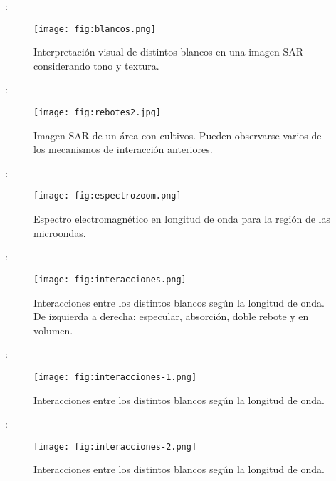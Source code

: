 \begin{frame}{\secname : \subsecname}
    \begin{figure}
      \centering
      \texttt{[image: fig:blancos.png]}
      \caption{Interpretación visual de distintos blancos en una imagen SAR considerando tono y textura.}
      \label{}
    \end{figure}
\end{frame}

\begin{frame}{\secname : \subsecname}
    \begin{figure}
      \centering
      \texttt{[image: fig:rebotes2.jpg]}
      \caption{Imagen SAR de un área con cultivos. Pueden observarse varios de los mecanismos de interacción anteriores.}
      \label{}
    \end{figure}
\end{frame}

\begin{frame}{\secname : \subsecname}
  \begin{figure}
    \centering
    \texttt{[image: fig:espectrozoom.png]}
    \caption{Espectro electromagnético en longitud de onda para la región de las microondas.}
    \label{}
  \end{figure}
\end{frame}

\begin{frame}{\secname : \subsecname}
    \begin{figure}
      \centering
      \texttt{[image: fig:interacciones.png]}
      \caption{Interacciones entre los distintos blancos según la longitud de onda. De izquierda a derecha: especular, absorción, doble rebote y en volumen.}
      \label{}
    \end{figure}
\end{frame}

\begin{frame}{\secname : \subsecname}
    \begin{figure}
      \centering
      \texttt{[image: fig:interacciones-1.png]}
      \caption{Interacciones entre los distintos blancos según la longitud de onda.}
      \label{}
    \end{figure}
\end{frame}

\begin{frame}{\secname : \subsecname}
    \begin{figure}
      \centering
      \texttt{[image: fig:interacciones-2.png]}
      \caption{Interacciones entre los distintos blancos según la longitud de onda.}
      \label{}
    \end{figure}
\end{frame}

